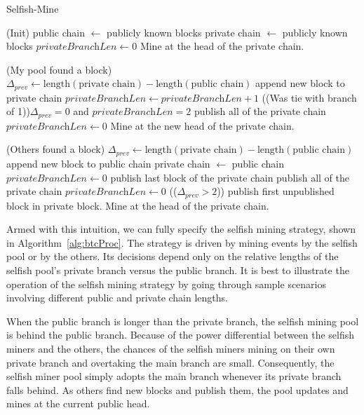 \documentclass[letterpaper]{llncs}
\begin{document}
\newcommand{\privateBranchLen}{\textit{privateBranchLen}} 
\newcommand{\prevDelta}{\ensuremath{ \Delta_{\textit{prev}} }} 

\begin{algorithm}[t] 
\SetAlgoNoLine 
\SetAlgoNoEnd 
\DontPrintSemicolon 
\caption{Selfish-Mine} 
\label{alg:btcProc} 
\KwOn(Init) { 
    public chain $\gets$ publicly known blocks \; 
    private chain $\gets$ publicly known blocks \; 
    $\privateBranchLen \gets 0$ \; 
    Mine at the head of the private chain. 
} 
\BlankLine \BlankLine 

\KwOn(My pool found a block) {
    $\prevDelta \gets \text{length}(\text{private chain}) - \text{length}(\text{public chain})$ \; 
    append new block to private chain \; 
    $\privateBranchLen \gets \privateBranchLen + 1$ \; 
    \If({\hfill(Was tie with branch of 1)}){$\prevDelta = 0$ and $\privateBranchLen = 2$} { 
        publish all of the private chain  
        $\privateBranchLen \gets 0$ \; 
    }
    Mine at the new head of the private chain. 
} 
\BlankLine \BlankLine 

\KwOn(Others found a block) { 
    $\prevDelta \gets \text{length}(\text{private chain}) - \text{length}(\text{public chain})$ \; 
    append new block to public chain \; 
    \If{$\prevDelta = 0$} { 
        private chain $\gets$ public chain  
        $\privateBranchLen \gets 0$ \; 
    } \ElseIf{$\prevDelta = 1$} {
        publish last block of the private chain  
    } \ElseIf{$\prevDelta = 2$} {
        publish all of the private chain  
        $\privateBranchLen \gets 0$ \; 
    } \Else({\hfill($\prevDelta > 2$)}) { 
        publish first unpublished block in private block. 
    }
    Mine at the head of the private chain. 
} 
\end{algorithm} 

Armed with this intuition, we can fully specify the selfish mining strategy, shown in Algorithm~\ref{alg:btcProc}. The strategy is driven by mining events by 
the selfish pool or by the others. Its decisions depend only on the relative lengths of the selfish pool's private branch versus the public branch.
It is best to illustrate the operation of the selfish mining strategy by going through sample scenarios involving different public and private chain lengths.

When the public branch is longer than the private branch, the selfish mining pool is behind the public branch. Because of the power differential between the selfish miners 
and the others, the chances of the selfish miners mining on their own private branch and overtaking the main branch are small. Consequently, the selfish miner pool simply adopts
the main branch whenever its private branch falls behind. As others find new blocks and publish them, the pool updates and mines at the current public head. 
\end{document}

